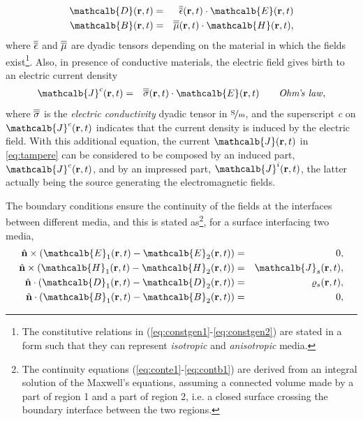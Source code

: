\begin{eqnarray}
\label{eq:constgen1}
\mathcalb{D}(\mathbf{r},t) &= & \dyad{\epsilon}(\mathbf{r},t) \cdot \mathcalb{E}(\mathbf{r},t) \\
\label{eq:constgen2}
\mathcalb{B}(\mathbf{r},t) &= &  \dyad{\mu}(\mathbf{r},t) \cdot \mathcalb{H}(\mathbf{r},t),
\end{eqnarray} 
where $\overline{\overline{\epsilon}}$ and $\overline{\overline{\mu}}$ are dyadic tensors depending on the material in which the fields exist\footnote{The constitutive relations in (\ref{eq:constgen1}-\ref{eq:constgen2}) are stated in a form such that they can represent \textit{isotropic} and \textit{anisotropic} media.}. Also, in presence of conductive materials, the electric field gives birth to an electric current density
\begin{eqnarray}
\mathcalb{J}^c(\mathbf{r},t) &= &\dyad{\sigma}(\mathbf{r},t) \cdot \mathcalb{E}(\mathbf{r},t) \qquad \mathit{Ohm}\textrm{'}\mathit{\!s \ law},
\end{eqnarray}
where $\overline{\overline{\sigma}}$ is the \textit{electric conductivity} dyadic tensor in $\mathrm{\nicefrac{\mathrm S}{\mathrm m}}$, and the superscript \textit{c} on $\mathcalb{J}^c(\mathbf{r},t)$ indicates that the current density is induced by the electric field. With this additional equation, the current $\mathcalb{J}(\mathbf{r},t)$ in \eqref{eq:tampere} can be considered to be composed by an induced part, $\mathcalb{J}^c(\mathbf{r},t)$, and by an impressed part, $\mathcalb{J}^i(\mathbf{r},t)$, the latter actually being the source generating the electromagnetic fields.
\par The boundary conditions ensure the continuity of the fields at the interfaces between different media, and this is stated as\footnote{The continuity equations (\ref{eq:conte1}-\ref{eq:contb1}) are derived from an integral solution of the Maxwell's equations, assuming a connected volume made by a part of region 1 and a part of region 2, i.e. a closed surface crossing the boundary interface between the two regions.}, for a surface interfacing two media,
\begin{eqnarray}
\hat{\mathbf{n}} \times \left ( \mathcalb{E}_1(\mathbf{r},t)-\mathcalb{E}_2(\mathbf{r},t) \right ) &= & 0,  \label{eq:conte1} \\
\hat{\mathbf{n}} \times \left ( \mathcalb{H}_1(\mathbf{r},t)-\mathcalb{H}_2(\mathbf{r},t) \right ) &= & \mathcalb{J}_s(\mathbf{r},t), \\
\hat{\mathbf{n}} \cdot \left ( \mathcalb{D}_1(\mathbf{r},t)-\mathcalb{D}_2(\mathbf{r},t) \right ) &= & \varrho_s(\mathbf{r},t), \\
\hat{\mathbf{n}} \cdot \left ( \mathcalb{B}_1(\mathbf{r},t)-\mathcalb{B}_2(\mathbf{r},t) \right ) &= & 0, \label{eq:contb1}
\end{eqnarray}
